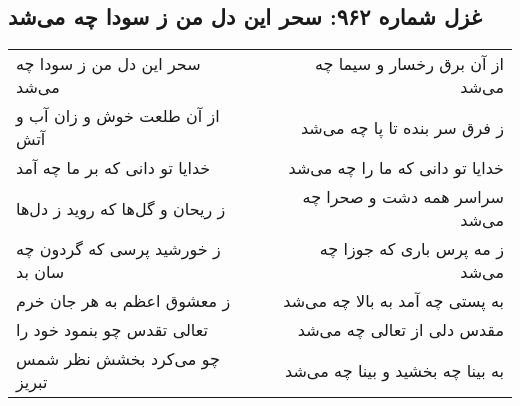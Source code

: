 \begin{center}
\section*{غزل شماره ۹۶۲: سحر این دل من ز سودا چه می‌شد}
\label{sec:0962}
\begin{longtable}{l p{0.5cm} r}
سحر این دل من ز سودا چه می‌شد
&&
از آن برق رخسار و سیما چه می‌شد
\\
از آن طلعت خوش و زان آب و آتش
&&
ز فرق سر بنده تا پا چه می‌شد
\\
خدایا تو دانی که بر ما چه آمد
&&
خدایا تو دانی که ما را چه می‌شد
\\
ز ریحان و گل‌ها که روید ز دل‌ها
&&
سراسر همه دشت و صحرا چه می‌شد
\\
ز خورشید پرسی که گردون چه سان بد
&&
ز مه پرس باری که جوزا چه می‌شد
\\
ز معشوق اعظم به هر جان خرم
&&
به پستی چه آمد به بالا چه می‌شد
\\
تعالی تقدس چو بنمود خود را
&&
مقدس دلی از تعالی چه می‌شد
\\
چو می‌کرد بخشش نظر شمس تبریز
&&
به بینا چه بخشید و بینا چه می‌شد
\\
\end{longtable}
\end{center}
